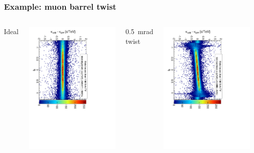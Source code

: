 \documentclass[compress]{beamer}
\begin{document}
\begin{frame}
\frametitle{Example: muon barrel twist}

\vspace{-0.2 cm}
\begin{columns}
\begin{center}
Ideal
\end{center}
\includegraphics[height=\linewidth, angle=90]{curvbias_vseta_ideal_1100_GlobalMuons2.pdf}

\begin{center}
0.5~mrad twist
\end{center}
\includegraphics[height=\linewidth, angle=90]{curvbias_vseta_twist0_5mrad_1100_GlobalMuons2.pdf}
\end{columns}


\end{frame}
\end{document}
